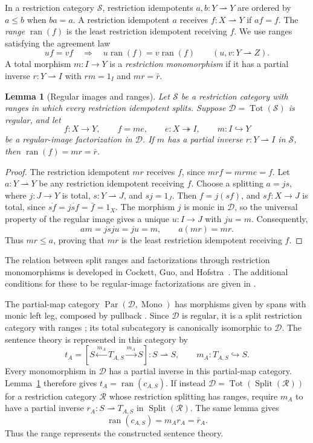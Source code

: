 \documentclass[11pt]{article}
\newtheorem{lemma}[theorem]{Lemma}
\theoremstyle{definition}\newtheorem{definition}[theorem]{Definition}
\newcommand{\ran}{\operatorname{ran}}
\newcommand{\Tot}{\operatorname{Tot}}
\newcommand{\Split}{\operatorname{Split}}
\newcommand{\Par}{\operatorname{Par}}
\newcommand{\Mono}{\operatorname{Mono}}
\begin{document}
In a restriction category $\mathcal S$, restriction idempotents
$a,b:Y\rightharpoonup Y$ are ordered by $a\leq b$ when $ba=a$.
A restriction idempotent $a$ receives $f:X\rightharpoonup Y$ if $af=f$.
The \emph{range} $\ran(f)$ is the least restriction idempotent receiving
$f$. We use ranges satisfying the agreement law
\[
 uf=vf\quad\Longrightarrow\quad u\ran(f)=v\ran(f)
 \qquad(u,v:Y\rightharpoonup Z).
\]
A total morphism $m:I\to Y$ is a \emph{restriction monomorphism}
if it has a partial inverse $r:Y\rightharpoonup I$ with
$rm=1_I$ and $mr=\bar r$.

\begin{lemma}[Regular images and ranges]\label{lem:range-regular-image}
Let $\mathcal S$ be a restriction category with ranges in which every
restriction idempotent splits. Suppose $\mathcal D=\Tot(\mathcal S)$
is regular, and let
\[
 f:X\longrightarrow Y,\qquad
 f=me,\qquad e:X\twoheadrightarrow I,\qquad m:I\hookrightarrow Y
\]
be a regular-image factorization in $\mathcal D$.
If $m$ has a partial inverse $r:Y\rightharpoonup I$ in $\mathcal S$,
then $\ran(f)=mr=\bar r$.
\end{lemma}
\begin{proof}
The restriction idempotent $mr$ receives $f$, since $mrf=mrme=f$.
Let $a:Y\rightharpoonup Y$ be any restriction idempotent receiving $f$.
Choose a splitting $a=js$, where $j:J\to Y$ is total,
$s:Y\rightharpoonup J$, and $sj=1_J$.
Then $f=j(sf)$, and $sf:X\to J$ is total, since
$\overline{sf}=\overline{jsf}=\bar f=1_X$.
The morphism $j$ is monic in $\mathcal D$, so the universal property
of the regular image gives a unique $u:I\to J$ with $ju=m$.
Consequently,
\[
 am=jsju=ju=m,\qquad a(mr)=mr.
\]
Thus $mr\leq a$, proving that $mr$ is the least restriction
idempotent receiving $f$.
\end{proof}

The relation between split ranges and factorizations through restriction
monomorphisms is developed in Cockett, Guo, and
Hofstra~\cite[Theorem 4.7 and Lemma 4.12]{CGHRangeI}.
The additional conditions for these to be regular-image factorizations
are given in \cite[Section 3.16 and Proposition 3.17]{CGHRangeII}.

The partial-map category $\Par(\mathcal D,\Mono)$ has morphisms given
by spans with monic left leg, composed by pullback
\cite[Section 3]{CockettLack}. Since $\mathcal D$ is regular, it is a
split restriction category with ranges
\cite[Theorem 4.5 and Section 4.11]{CGHRangeI}; its total subcategory
is canonically isomorphic to $\mathcal D$.
The sentence theory is represented in this category by
\[
 t_A=[S\xleftarrow{m_A}T_{A,S}\xrightarrow{m_A}S]:S\rightharpoonup S,
 \qquad m_A:T_{A,S}\hookrightarrow S.
\]
Every monomorphism in $\mathcal D$ has a partial inverse in this
partial-map category. Lemma~\ref{lem:range-regular-image} therefore
gives $t_A=\ran(c_{A,S})$.
If instead $\mathcal D=\Tot(\Split(\mathcal R))$ for a restriction
category $\mathcal R$ whose restriction splitting has ranges, require
$m_A$ to have a partial inverse
$r_A:S\rightharpoonup T_{A,S}$ in $\Split(\mathcal R)$.
The same lemma gives
\[
 \ran(c_{A,S})=m_A r_A=\bar r_A.
\]
Thus the range represents the constructed sentence theory.
\end{document}
